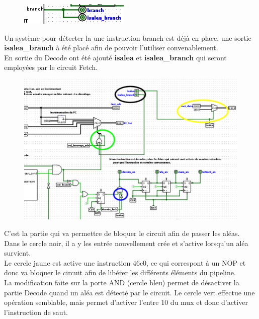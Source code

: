 \documentclass[a4paper]{article} %
\begin{document}
\begin{figure}[H]
   \centering
   \includegraphics[width=.8\textwidth]{src/ALEAS_saut.png}
\end{figure}
Un système pour détecter la une instruction branch est déjà en place, une sortie \textbf{isalea\_branch} à été placé afin de pouvoir l'utiliser convenablement.\\
En sortie du Decode ont été ajouté \textbf{isalea} et \textbf{isalea\_branch} qui seront employées par le circuit Fetch.

\begin{figure}[H]
   \centering
   \includegraphics[width=.8\textwidth]{src/FETCH.png}
\end{figure}

C'est la partie qui va permettre de bloquer le circuit afin de passer les aléas.\\
Dans le cercle noir, il a y les entrée nouvellement crée et s'active lorsqu'un aléa survient.\\
Le cercle jaune est active une instruction 46c0, ce qui correspont à un NOP et donc va bloquer le circuit afin de libérer les différents éléments du pipeline.\\

La modification faite sur la porte AND (cercle bleu) permet de désactiver la partie Decode quand un aléa est détecté par le circuit. Le cercle vert effectue une opération semblable, mais permet d'activer l'entre 10 du mux et donc d'activer l'instruction de saut.
\end{document}
